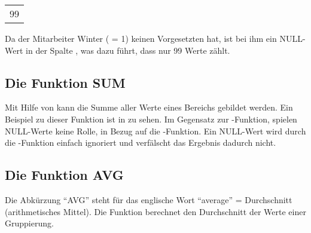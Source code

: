           \begin{center}
            \begin{small}
              \tablehead{}
              \begin{msoraclesql}
                \begin{supertabular}{r}
                  99 \\
                \end{supertabular}
              \end{msoraclesql}
            \end{small}
          \end{center}
          Da der Mitarbeiter Winter ( = 1) keinen Vorgesetzten hat, ist bei ihm ein NULL-Wert in der Spalte , was dazu führt, dass  nur 99 Werte zählt.
      \subsection{Die Funktion SUM}
        Mit Hilfe von  kann die Summe aller Werte eines Bereichs gebildet werden. Ein Beispiel zu dieser Funktion ist in  zu sehen. Im Gegensatz zur -Funktion, spielen NULL-Werte keine Rolle, in Bezug auf die -Funktion. Ein NULL-Wert wird durch die -Funktion einfach ignoriert und verfälscht das Ergebnis dadurch nicht.
      \subsection{Die Funktion AVG}
        Die Abkürzung \enquote{AVG} steht für das englische Wort \enquote{average} = Durchschnitt (arithmetisches Mittel). Die Funktion  berechnet den Durchschnitt der Werte einer Gruppierung.

